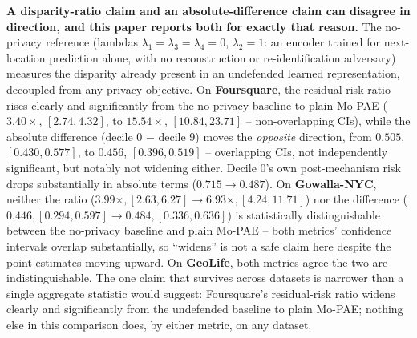 \textbf{A disparity-ratio claim and an absolute-difference claim can
disagree in direction, and this paper reports both for exactly that
reason.} The no-privacy reference (lambdas
$\lambda_1=\lambda_3=\lambda_4=0$, $\lambda_2=1$: an encoder trained for
next-location prediction alone, with no reconstruction or
re-identification adversary) measures the disparity already present in
an undefended learned representation, decoupled from any privacy
objective. On \textbf{Foursquare}, the residual-risk ratio rises
clearly and significantly from the no-privacy baseline to plain Mo-PAE
($3.40\times$, $[2.74,4.32]$, to $15.54\times$, $[10.84,23.71]$ --
non-overlapping CIs), while the absolute difference (decile 0 $-$
decile 9) moves the \emph{opposite} direction, from $0.505$,
$[0.430,0.577]$, to $0.456$, $[0.396,0.519]$ -- overlapping CIs, not
independently significant, but notably not widening either. Decile 0's
own post-mechanism risk drops substantially in absolute terms
($0.715 \to 0.487$). On \textbf{Gowalla-NYC}, neither the ratio
($3.99\times,[2.63,6.27] \to 6.93\times,[4.24,11.71]$) nor the
difference ($0.446,[0.294,0.597] \to 0.484,[0.336,0.636]$) is
statistically distinguishable between the no-privacy baseline and
plain Mo-PAE -- both metrics' confidence intervals overlap
substantially, so ``widens'' is not a safe claim here despite the point
estimates moving upward. On \textbf{GeoLife}, both metrics agree the
two are indistinguishable. The one claim that survives across datasets
is narrower than a single aggregate statistic would suggest:
Foursquare's residual-risk ratio widens clearly and significantly from
the undefended baseline to plain Mo-PAE; nothing else in this
comparison does, by either metric, on any dataset.

